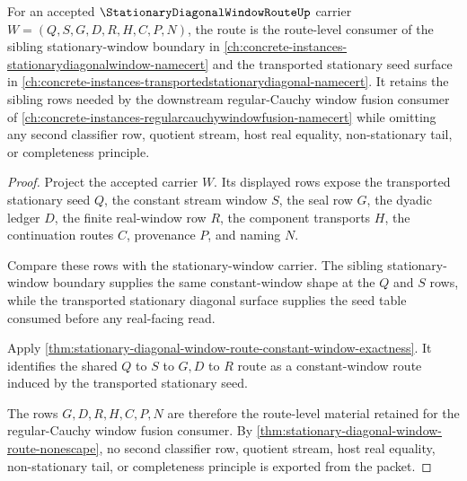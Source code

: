 \begin{theorem}
\label{thm:stationary-diagonal-window-route-window-dependency}
For an accepted $\StationaryDiagonalWindowRouteUp$ carrier $W=(Q,S,G,D,R,H,C,P,N)$, the route is the route-level consumer of the sibling stationary-window boundary in \autoref{ch:concrete-instances-stationarydiagonalwindow-namecert} and the transported stationary seed surface in \autoref{ch:concrete-instances-transportedstationarydiagonal-namecert}. It retains the sibling rows needed by the downstream regular-Cauchy window fusion consumer of \autoref{ch:concrete-instances-regularcauchywindowfusion-namecert} while omitting any second classifier row, quotient stream, host real equality, non-stationary tail, or completeness principle.
\end{theorem}
\begin{proof}
Project the accepted carrier $W$. Its displayed rows expose the transported stationary seed $Q$, the constant stream window $S$, the seal row $G$, the dyadic ledger $D$, the finite real-window row $R$, the component transports $H$, the continuation routes $C$, provenance $P$, and naming $N$.

Compare these rows with the stationary-window carrier. The sibling stationary-window boundary supplies the same constant-window shape at the $Q$ and $S$ rows, while the transported stationary diagonal surface supplies the seed table consumed before any real-facing read.

Apply \autoref{thm:stationary-diagonal-window-route-constant-window-exactness}. It identifies the shared $Q$ to $S$ to $G,D$ to $R$ route as a constant-window route induced by the transported stationary seed.

The rows $G,D,R,H,C,P,N$ are therefore the route-level material retained for the regular-Cauchy window fusion consumer. By \autoref{thm:stationary-diagonal-window-route-nonescape}, no second classifier row, quotient stream, host real equality, non-stationary tail, or completeness principle is exported from the packet.
\end{proof}

